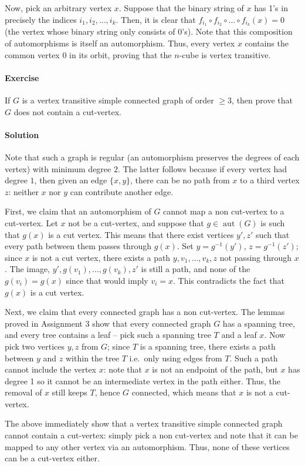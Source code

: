 \documentclass[10pt]{article}
\newcounter{prob}
\newcommand{\problem}{\stepcounter{prob}\paragraph{Exercise \arabic{prob}}}
\newcommand{\solution}{\paragraph{Solution}}
\DeclareMathOperator{\aut}{aut}
\begin{document}
    Now, pick an arbitrary vertex $x$. Suppose that the binary string of $x$ has 1's
    in precisely the indices $i_1, i_2, \dots, i_k$. Then, it is clear that
    $f_{i_1}\circ f_{i_2}\circ \dots \circ f_{i_k}(x) = 0$ (the vertex whose binary
    string only consists of 0's). Note that this composition of automorphisms is
    itself an automorphism. Thus, every vertex $x$ contains the common vertex $0$ in
    its orbit, proving that the $n$-cube is vertex transitive.


    \problem If $G$ is a vertex transitive simple connected graph of order $\geq 3$,
    then prove that $G$ does not contain a cut-vertex.

    \solution Note that such a graph is regular (an automorphism preserves the
    degrees of each vertex) with minimum degree $2$. The latter follows because if
    every vertex had degree $1$, then given an edge $\{x, y\}$, there can be no path
    from $x$ to a third vertex $z$: neither $x$ nor $y$ can contribute another edge.     

    First, we claim that an automorphism of $G$ cannot map a non cut-vertex to a
    cut-vertex. Let $x$ not be a cut-vertex, and suppose that $g \in \aut(G)$ is such
    that $g(x)$ is a cut vertex. This means that there exist vertices $y', z'$ such
    that every path between them passes through $g(x)$. Set $y = g^{-1}(y')$, $z =
    g^{-1}(z')$; since $x$ is not a cut vertex, there exists  a path $y, v_1, \dots,
    v_k, z$ not passing through $x$. The image, $y', g(v_1), \dots, g(v_k), z'$ is
    still a path, and none of the $g(v_i) = g(x)$ since that would imply $v_i = x$.
    This contradicts the fact that $g(x)$ is a cut vertex.

    Next, we claim that every connected graph has a non cut-vertex. The lemmas proved
    in Assignment 3 show that every connected graph $G$ has a spanning tree, and
    every tree contains a leaf -- pick such a spanning tree $T$ and a leaf $x$. Now
    pick two vertices $y, z$ from $G$; since $T$ is a spanning tree, there exists a
    path between $y$ and $z$ within the tree $T$ i.e.\ only using edges from $T$.
    Such a path cannot include the vertex $x$: note that $x$ is not an endpoint of
    the path, but $x$ has degree 1 so it cannot be an intermediate vertex in the path
    either. Thus, the removal of $x$ still keeps $T$, hence $G$ connected, which
    means that $x$ is not a cut-vertex.

    The above immediately show that a vertex transitive simple connected graph cannot
    contain a cut-vertex: simply pick a non cut-vertex and note that it can be mapped
    to any other vertex via an automorphism. Thus, none of these vertices can be a
    cut-vertex either.
\end{document}
